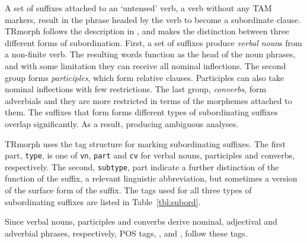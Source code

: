 \documentclass[twocolumn]{article}
\begin{document}
A set of suffixes attached to an `untensed' verb, a verb without any
TAM markers, result in the phrase headed by the verb to become a
subordinate clause. TRmorph follows the description in
\cite{goksel2005}, and makes the distinction between three different
forms of subordination. First, a set of suffixes produce \emph{verbal
noun}s from a non-finite verb. The resulting words function as the
head of the noun phrases,
and with some limitation they can receive all nominal inflections. The
second group forms \emph{participles}, which form relative clauses.
Participles can also take nominal inflections with few
restrictions. The last group, \emph{converbs}, form adverbials and
they are more restricted in terms of the morphemes attached to
them. The suffixes that form forms different types of subordinating
suffixes overlap significantly. As a result, producing ambiguous
analyses.

TRmorph uses the tag structure  for marking
subordinating suffixes. The first part, \texttt{type}, is one of
\texttt{vn}, \texttt{part} and \texttt{cv} for verbal nouns,
participles and converbs, respectively. The second, \texttt{subtype}, 
part indicate a further distinction of the function of the suffix,
a relevant linguistic abbreviation, but sometimes a version of the
surface form of the suffix. The tags used for all three types of
subordinating suffixes are listed in Table~\ref{tbl:subord}.

Since verbal nouns, participles and converbs derive nominal, adjectival
and adverbial phrases, respectively, POS tags, , 
and , follow these tags.
\end{document}
